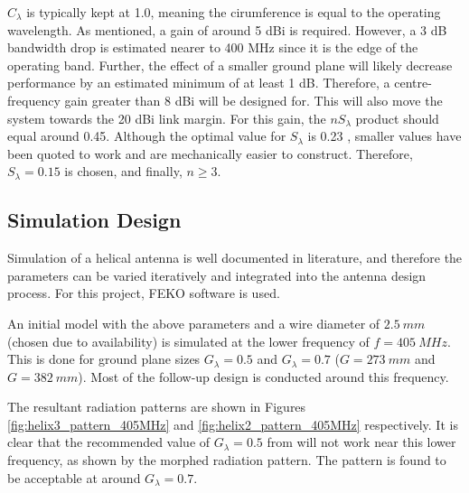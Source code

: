 $C_\lambda$ is typically kept at 1.0, meaning the cirumference is equal to the operating wavelength. As mentioned, a gain of around 5 dBi is required. However, a 3 dB bandwidth drop is estimated nearer to 400 MHz since it is the edge of the operating band. Further, the effect of a smaller ground plane will likely decrease performance by an estimated minimum of at least 1 dB. Therefore, a centre-frequency gain greater than 8 dBi will be designed for. This will also move the system towards the 20 dBi link margin. For this gain, the $n S_\lambda$ product should equal around 0.45. Although the optimal value for $S_\lambda$ is 0.23 \cite{textbook-antennaTheoryAnalysisDesign}, smaller values have been quoted to work \cite{site-helicalCalculator} and are mechanically easier to construct. Therefore, $S_\lambda = 0.15$ is chosen, and finally, $n \geq 3$.

\subsection{Simulation Design}
Simulation of a helical antenna is well documented in literature, and therefore the parameters can be varied iteratively and integrated into the antenna design process. For this project, FEKO software is used.

An initial model with the above parameters and a wire diameter of $\SI{2.5}{mm}$ (chosen due to availability) is simulated at the lower frequency of $f = \SI{405}{MHz}$. This is done for ground plane sizes $G_\lambda = 0.5$ and $G_\lambda = 0.7$ ($G = \SI{273}{mm}$ and $G = \SI{382}{mm}$). Most of the follow-up design is conducted around this frequency.

The resultant radiation patterns are shown in Figures \ref{fig:helix3_pattern_405MHz} and \ref{fig:helix2_pattern_405MHz} respectively. It is clear that the recommended value of $G_\lambda = 0.5$ from \cite{textbook-antennaTheoryAnalysisDesign} will not work near this lower frequency, as shown by the morphed radiation pattern. The pattern is found to be acceptable at around $G_\lambda = 0.7$.

